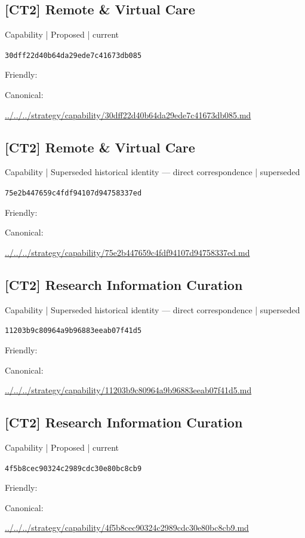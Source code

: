 \documentclass[10pt,a4paper]{article}
\begin{document}
\subsection*{[CT2] Remote \& Virtual Care}
{\small Capability | Proposed | current}\par
\texttt{30dff22d40b64da29ede7c41673db085}\par
Friendly: \par
Canonical: \par
{\footnotesize\url{../../../strategy/capability/30dff22d40b64da29ede7c41673db085.md}}\par
\subsection*{[CT2] Remote \& Virtual Care}
{\small Capability | Superseded historical identity — direct correspondence | superseded}\par
\texttt{75e2b447659c4fdf94107d94758337ed}\par
Friendly: \par
Canonical: \par
{\footnotesize\url{../../../strategy/capability/75e2b447659c4fdf94107d94758337ed.md}}\par
\subsection*{[CT2] Research Information Curation}
{\small Capability | Superseded historical identity — direct correspondence | superseded}\par
\texttt{11203b9c80964a9b96883eeab07f41d5}\par
Friendly: \par
Canonical: \par
{\footnotesize\url{../../../strategy/capability/11203b9c80964a9b96883eeab07f41d5.md}}\par
\subsection*{[CT2] Research Information Curation}
{\small Capability | Proposed | current}\par
\texttt{4f5b8cec90324c2989cdc30e80bc8cb9}\par
Friendly: \par
Canonical: \par
{\footnotesize\url{../../../strategy/capability/4f5b8cec90324c2989cdc30e80bc8cb9.md}}\par
\end{document}
